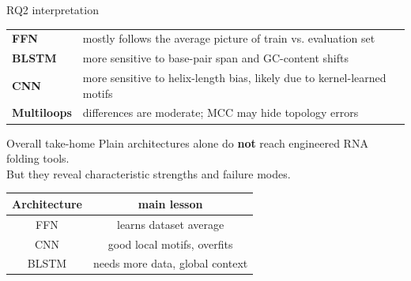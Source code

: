 \documentclass{beamer}
\begin{document}
\begin{frame}{RQ2 interpretation}
  \vfill
  \begin{tabularx}{\textwidth}{@{}>{\bfseries}l X@{}}
    FFN        & mostly follows the average picture of train vs. evaluation set           \\[0.9em]
    BLSTM      & more sensitive to base-pair span and GC-content shifts                   \\[0.9em]
    CNN        & more sensitive to helix-length bias, likely due to kernel-learned motifs \\[0.9em]
    Multiloops & differences are moderate; MCC may hide topology errors                   \\
  \end{tabularx}
  \vfill
\end{frame}

\begin{frame}{Overall take-home}
  \vfill
  \Large
  Plain architectures alone do \textbf{not} reach engineered RNA folding tools.\\[0.9em]
  But they reveal characteristic strengths and failure modes.\\[1.1em]
  \begin{center}
    \begin{tabular}{c|c}
      \textbf{Architecture} & \textbf{main lesson}            \\
      \hline
      FFN                   & learns dataset average          \\
      CNN                   & good local motifs, overfits     \\
      BLSTM                 & needs more data, global context \\
    \end{tabular}
  \end{center}
  \vfill
\end{frame}
\end{document}
